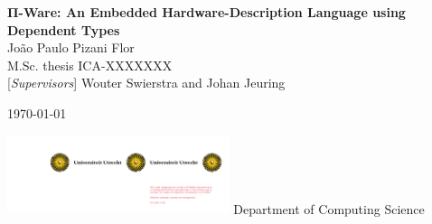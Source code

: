 

\begin{titlepage}

    \HRule
    \begin{flushright}
        \Huge \textbf{Π-Ware: An Embedded Hardware-Description Language using Dependent Types}\\[10.0pt]%
        \LARGE João Paulo Pizani Flor\\[1.5pt]%
        \vfill
        \large M.Sc. thesis
        ICA-XXXXXXX\\
        \large {[}\emph{Supervisors}{]} Wouter Swierstra and Johan Jeuring \\[7mm]
    \end{flushright}
    \begin{center}%
        \today%
    \end{center}%
    \vskip -3mm
    \HRule
    \vfill
    \hfill \includegraphics[width=6.5cm]{imgs/uusol-links.pdf}
    \vskip 3mm
    \hfill {\large Department of Computing Science}
\end{titlepage}

\clearpage


\restoregeometry

